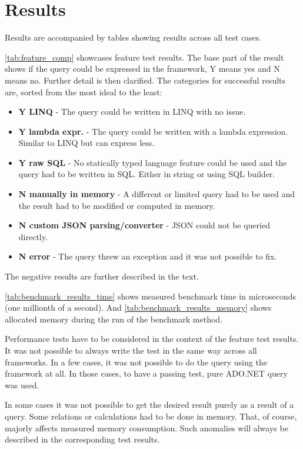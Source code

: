 \section{Results}
Results are accompanied by tables showing results across all test cases. 

\autoref{tab:feature_comp} showcases feature test results. The base part of the result shows if the query could be expressed in the framework, Y means yes and N means no. Further detail is then clarified. The categories for successful results are, sorted from the most ideal to the least:
\begin{itemize}
    \item \textbf{Y LINQ} - The query could be written in LINQ with no issue.
    \item \textbf{Y lambda expr.} - The query could be written with a lambda expression. Similar to LINQ but can express less.
    \item \textbf{Y raw SQL} - No statically typed language feature could be used and the query had to be written in SQL. Either in string or using SQL builder.
    \item \textbf{N manually in memory} - A different or limited query had to be used and the result had to be modified or computed in memory.
    \item \textbf{N custom JSON parsing/converter} - JSON could not be queried directly.
    \item \textbf{N error} - The query threw an exception and it was not possible to fix. 
\end{itemize}
The negative results are further described in the text.

\autoref{tab:benchmark_results_time} shows measured benchmark time in microseconds (one millionth of a second). And \autoref{tab:benchmark_results_memory} shows allocated memory during the run of the benchmark method.

Performance tests have to be considered in the context of the feature test results. It was not possible to always write the test in the same way across all frameworks. In a few cases, it was not possible to do the query using the framework at all. In those cases, to have a passing test, pure ADO.NET query was used. 

In some cases it was not possible to get the desired result purely as a result of a query. Some relations or calculations had to be done in memory. That, of course, majorly affects measured memory consumption. Such anomalies will always be described in the corresponding test results.

